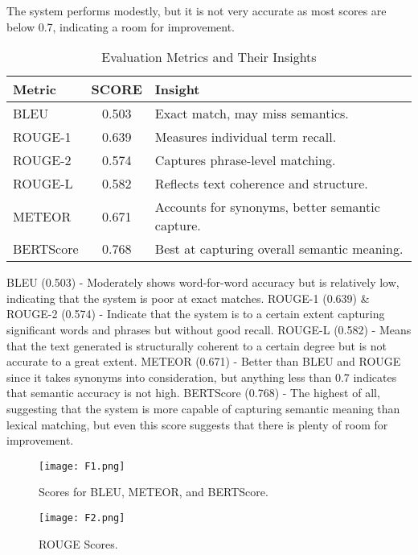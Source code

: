 The system performs modestly, but it is not very accurate as most scores are below 0.7, indicating a room for improvement.
\begin{table}[h]
    \centering
    \renewcommand{\arraystretch}{1.2}
    \begin{tabular}{|l|c|l|}
        \hline
         \textbf{Metric} & \textbf{SCORE} & \textbf{Insight} \\
        \hline
        BLEU & 0.503 & Exact match, may miss semantics. \\
        \hline
        ROUGE-1 & 0.639 & Measures individual term recall. \\
        \hline
        ROUGE-2 & 0.574 & Captures phrase-level matching. \\
        \hline
        ROUGE-L & 0.582 & Reflects text coherence and structure. \\
        \hline
        METEOR & 0.671 & Accounts for synonyms, better semantic capture. \\
        \hline
        BERTScore & 0.768 & Best at capturing overall semantic meaning. \\
        \hline
    \end{tabular}
    \vspace{10pt}
    \caption{Evaluation Metrics and Their Insights}
    \label{tab:metrics}
\end{table}

BLEU (0.503) - Moderately shows word-for-word accuracy but is relatively low, indicating that the system is poor at exact matches.
ROUGE-1 (0.639) \& ROUGE-2 (0.574) - Indicate that the system is to a certain extent capturing significant words and phrases but without good recall.
ROUGE-L (0.582) - Means that the text generated is structurally coherent to a certain degree but is not accurate to a great extent.
METEOR (0.671) - Better than BLEU and ROUGE since it takes synonyms into consideration, but anything less than 0.7 indicates that semantic accuracy is not high.
BERTScore (0.768) - The highest of all, suggesting that the system is more capable of capturing semantic meaning than lexical matching, but even this score suggests that there is plenty of room for improvement.
\begin{figure}[h!]
    \centering
    \texttt{[image: F1.png]}
    \caption{Scores for BLEU, METEOR, and BERTScore.}
    \label{fig:f1}
\end{figure}

\begin{figure}[h!]
    \centering
    \texttt{[image: F2.png]}
    \caption{ROUGE Scores.}
    \label{fig:f2}
\end{figure}

